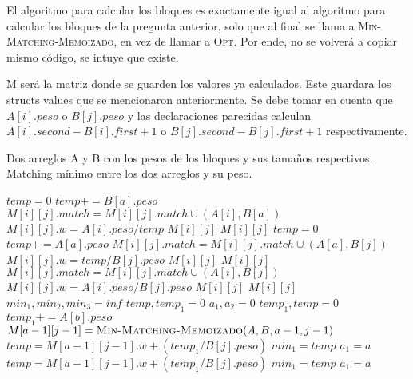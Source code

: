 \documentclass[12pt]{article}
\newcommand{\TITLE}[1]{\item[#1]}
\begin{document}
El algoritmo para calcular los bloques es exactamente igual al algoritmo para calcular los bloques de la pregunta anterior, solo que al final se llama a \textsc{Min-Matching-Memoizado}, en vez de llamar a \textsc{Opt}. Por ende, no se volverá a copiar mismo código, se intuye que existe.

M será la matriz donde se guarden los valores ya calculados. Este guardara los structs values que se mencionaron anteriormente.
Se debe tomar en cuenta que $A[i].peso$ o $B[j].peso$ y las declaraciones parecidas calculan $A[i].second-B[i].first+1$ o $B[j].second-B[j].first+1$ respectivamente.

\begin{algorithmic}[1]
    \REQUIRE Dos arreglos A y B con los pesos de los bloques y sus tamaños respectivos.
    \ENSURE Matching mínimo entre los dos arreglos y su peso.
    \TITLE{\textsc{Min-Matching-Memoizado}$(A,B,i,j)$}                                  
            \STATE $temp = 0$
                \STATE $temp += B[a].peso$    
                \STATE $M[i][j].match = M[i][j].match \cup (A[i], B[a])$   
            \ENDFOR
            \STATE $M[i][j].w = A[i].peso/temp$    
            \RETURN $M[i][j]$
        \ELSE
            \RETURN $M[i][j]$
        \ENDIF
            \STATE $temp = 0$     
                \STATE $temp += A[a].peso$     
                \STATE $M[i][j].match = M[i][j].match \cup (A[a], B[j])$ 
            \ENDFOR
            \STATE $M[i][j].w = temp/B[j].peso$  
            \RETURN $M[i][j]$
        \ELSE
            \RETURN $M[i][j]$
        \ENDIF
            \STATE $M[i][j].match = M[i][j].match \cup (A[i], B[j])$
            \STATE $M[i][j].w = A[i].peso/B[j].peso$
            \RETURN $M[i][j]$
        \ELSE
            \RETURN $M[i][j]$
        \ENDIF
            \STATE $min_1,min_2,min_3 = inf$
            \STATE $temp,temp_1 = 0$
            \STATE $a_1,a_2 = 0$
                \STATE $temp_1,temp = 0$
                    \STATE $temp_1 += A[b].peso$
                \ENDFOR
                    \STATE $M[a-1][j-1] = \textsc{Min-Matching-Memoizado}(A,B,a-1,j-1)$
                    \STATE $temp = M[a-1][j-1].w + (temp_1/B[j].peso)$
                        \STATE $min_1 = temp$
                        \STATE $a_1 = a$
                    \ENDIF
                \ELSE
                    \STATE $temp = M[a-1][j-1].w + (temp_1/B[j].peso)$
                        \STATE $min_1 = temp$
                        \STATE $a_1 = a$
                    \ENDIF
                \ENDIF
            \ENDFOR
            

\end{algorithmic}
\end{document}
